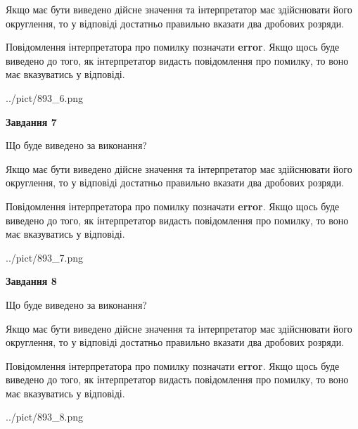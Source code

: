 \documentclass[12pt, ukrainian]{article}
\begin{document}
{\begin {Large}
Якщо має бути виведено дійсне значення та інтерпретатор має здійснювати його округлення, 
то у відповіді достатньо правильно вказати два дробових розряди.

Повідомлення інтерпретатора про помилку позначати \textbf{error}.
Якщо щось буде виведено до того, як інтерпретатор видасть повідомлення про помилку, 
то воно має вказуватись у відповіді. \par

\begin{center}
	{../pict/893_6.png}
\end{center}
\newpage

{\begin {center}\textbf{Завдання 7}\end {center}}\par
Що буде виведено за виконання? \par

Якщо має бути виведено дійсне значення та інтерпретатор має здійснювати його округлення, 
то у відповіді достатньо правильно вказати два дробових розряди.

Повідомлення інтерпретатора про помилку позначати \textbf{error}.
Якщо щось буде виведено до того, як інтерпретатор видасть повідомлення про помилку, 
то воно має вказуватись у відповіді. \par

\begin{center}
	{../pict/893_7.png}
\end{center}
\newpage

{\begin {center}\textbf{Завдання 8}\end {center}}\par
Що буде виведено за виконання? \par

Якщо має бути виведено дійсне значення та інтерпретатор має здійснювати його округлення, 
то у відповіді достатньо правильно вказати два дробових розряди.

Повідомлення інтерпретатора про помилку позначати \textbf{error}.
Якщо щось буде виведено до того, як інтерпретатор видасть повідомлення про помилку, 
то воно має вказуватись у відповіді. \par

\begin{center}
	{../pict/893_8.png}
\end{center}
\newpage


\end{Large}}
\end{document}
